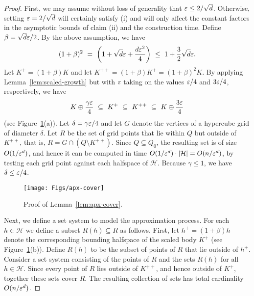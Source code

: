 \documentclass[11pt]{article}   \usepackage[letterpaper,hmargin=2.1cm,vmargin=3cm]{geometry}
\begin{document}
\begin{proof}
First, we may assume without loss of generality that $\varepsilon \le 2/\sqrt{d}$. Otherwise, setting $\varepsilon = 2/\sqrt{d}$ will certainly satisfy (i) and will only affect the constant factors in the asymptotic bounds of claim (ii) and the construction time. Define $\beta = \sqrt{d}\varepsilon/2$. By the above assumption, we have
\[
	(1 + \beta)^2
		~  =  ~ \left( 1 + \sqrt{d}\varepsilon + \frac{d \varepsilon^2}{4} \right)
		~ \le ~ 1 + \frac{3}{2}\sqrt{d}\varepsilon.
\]
Let $K^+ = (1 + \beta) K$ and let $K^{++} = (1 + \beta) K^+ = (1 + \beta)^2 K$. By applying Lemma~\ref{lem:scaled-growth} but with $\varepsilon$ taking on the values $\varepsilon/4$ and $3\varepsilon/4$, respectively, we have
\begin{equation}
	K \oplus \frac{\gamma \varepsilon}{4}
		~ \subseteq ~ K^+
		~ \subseteq ~ K^{++}
		~ \subseteq ~ K \oplus \frac{3\varepsilon}{4} \label{eq:apx-cover}
\end{equation}
(see Figure~\ref{fig:apx-cover}(a)). Let $\delta = \gamma \varepsilon/4$ and let $G$ denote the vertices of a hypercube grid of diameter $\delta$. Let $R$ be the set of grid points that lie within $Q$ but outside of $K^{++}$, that is, $R = G \cap (Q \setminus K^{++})$. Since $Q \subseteq Q_0$, the resulting set is of size $O(1/\varepsilon^d)$, and hence it can be computed in time $O(1/\varepsilon^d) \cdot |\mathcal{H}| = O(n/\varepsilon^d)$, by testing each grid point against each halfspace of $\mathcal{H}$. Because $\gamma \le 1$, we have $\delta \le \varepsilon/4$.

\begin{figure}[htbp]
  \centerline{\texttt{[image: Figs/apx-cover]}}
  \caption{Proof of Lemma~\ref{lem:apx-cover}.}
  \label{fig:apx-cover}
\end{figure}


Next, we define a set system to model the approximation process. For each $h \in \mathcal{H}$ we define a subset $R(h) \subseteq R$ as follows. First, let $h^+ = (1 + \beta) h$ denote the corresponding bounding halfspace of the scaled body $K^+$ (see Figure~\ref{fig:apx-cover}(b)). Define $R(h)$ to be the subset of points of $R$ that lie outside of $h^+$. Consider a set system consisting of the points of $R$ and the sets $R(h)$ for all $h \in \mathcal{H}$. Since every point of $R$ lies outside of $K^{++}$, and hence outside of $K^+$, together these sets cover $R$. The resulting collection of sets has total cardinality $O(n/\varepsilon^d)$. 


\end{proof}
\end{document}
